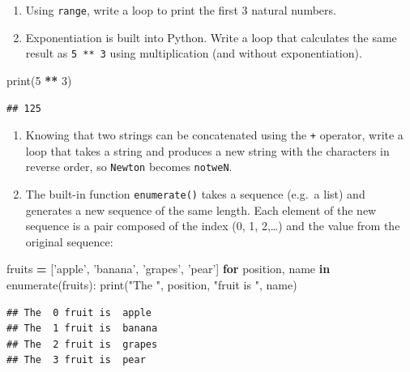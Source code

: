 \documentclass[]{book}
\newenvironment{Shaded}{\begin{snugshade}}{\end{snugshade}}
\newcommand{\BuiltInTok}[1]{#1}
\newcommand{\ControlFlowTok}[1]{\textcolor[rgb]{0.13,0.29,0.53}{\textbf{#1}}}
\newcommand{\DecValTok}[1]{\textcolor[rgb]{0.00,0.00,0.81}{#1}}
\newcommand{\KeywordTok}[1]{\textcolor[rgb]{0.13,0.29,0.53}{\textbf{#1}}}
\newcommand{\NormalTok}[1]{#1}
\newcommand{\OperatorTok}[1]{\textcolor[rgb]{0.81,0.36,0.00}{\textbf{#1}}}
\newcommand{\StringTok}[1]{\textcolor[rgb]{0.31,0.60,0.02}{#1}}
\providecommand{\tightlist}{%
  \setlength{\itemsep}{0pt}\setlength{\parskip}{0pt}}
\theoremstyle{definition}
\theoremstyle{definition}
\theoremstyle{definition}
\theoremstyle{remark}
\begin{document}
\begin{enumerate}
\def\labelenumi{\arabic{enumi}.}
\tightlist
\item
  Using \texttt{range}, write a loop to print the first 3 natural
  numbers.
\item
  Exponentiation is built into Python. Write a loop that calculates the
  same result as \texttt{5\ **\ 3} using multiplication (and without
  exponentiation).
\end{enumerate}

\begin{Shaded}
\begin{Highlighting}[]
\BuiltInTok{print}\NormalTok{(}\DecValTok{5} \OperatorTok{**} \DecValTok{3}\NormalTok{)}
\end{Highlighting}
\end{Shaded}

\begin{verbatim}
## 125
\end{verbatim}

\begin{enumerate}
\def\labelenumi{\arabic{enumi}.}
\setcounter{enumi}{2}
\tightlist
\item
  Knowing that two strings can be concatenated using the \texttt{+}
  operator, write a loop that takes a string and produces a new string
  with the characters in reverse order, so
  \texttt{\textquotesingle{}Newton\textquotesingle{}} becomes
  \texttt{\textquotesingle{}notweN\textquotesingle{}}.
\item
  The built-in function \texttt{enumerate()} takes a sequence (e.g.~a
  list) and generates a new sequence of the same length. Each element of
  the new sequence is a pair composed of the index (0, 1, 2,\ldots{})
  and the value from the original sequence:
\end{enumerate}

\begin{Shaded}
\begin{Highlighting}[]
\NormalTok{fruits }\OperatorTok{=}\NormalTok{ [}\StringTok{'apple'}\NormalTok{, }\StringTok{'banana'}\NormalTok{, }\StringTok{'grapes'}\NormalTok{, }\StringTok{'pear'}\NormalTok{]}
\ControlFlowTok{for}\NormalTok{ position, name }\KeywordTok{in} \BuiltInTok{enumerate}\NormalTok{(fruits):}
  \BuiltInTok{print}\NormalTok{(}\StringTok{"The "}\NormalTok{, position, }\StringTok{"fruit is "}\NormalTok{, name)}
\end{Highlighting}
\end{Shaded}

\begin{verbatim}
## The  0 fruit is  apple
## The  1 fruit is  banana
## The  2 fruit is  grapes
## The  3 fruit is  pear
\end{verbatim}
\end{document}
